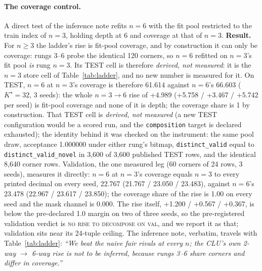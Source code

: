 \documentclass{article} %
\newcommand{\Kstar}{\ensuremath{K^{\star}}}
\begin{document}
\paragraph{The coverage control.} A direct test of the inference note refits $n=6$ with the
fit pool restricted to the train index of $n=3$, holding depth at 6 and coverage at that of $n=3$.
\textbf{Result.} For $n\ge3$ the ladder's rise is fit-pool
coverage, and by construction it can only be coverage: rungs 3--6 probe the identical 120 corners, %
so $n=6$ refitted on $n=3$'s fit pool \emph{is} rung $n=3$. Its TEST cell is therefore
\emph{derived, not measured}: it is the $n=3$ store cell of Table~\ref{tab:ladder}, and no new
number is measured for it. %
On TEST, $n=6$ at $n=3$'s coverage is therefore 61.614 against $n=6$'s 66.603 ($\Kstar=32$, 3 seeds): %
the whole $n=3\to6$ rise of +4.989 (+5.758 / +3.467 / +5.742 per seed) is fit-pool coverage and %
none of it is depth; the coverage share is 1 by construction. That TEST cell is \emph{derived, not
measured} (a new TEST configuration would be a scored run, and the \texttt{composition} target is
declared exhausted); the identity behind it was checked on the instrument: the same pool draw,
acceptance 1.000000 under either rung's bitmap, \texttt{distinct\_valid} equal to %
\texttt{distinct\_valid\_novel} in 3,600 of 3,600 published TEST rows, and the identical 8,640 %
corner rows. Validation, the one measured leg (60 corners of 24 rows, 3 seeds), measures it %
directly: $n=6$ at $n=3$'s coverage equals $n=3$ to every printed decimal on every seed, 22.767 %
(21.767 / 23.050 / 23.483), against $n=6$'s 23.478 (22.967 / 23.617 / 23.850); the coverage %
share of the rise is 1.00 on every seed and the mask channel is 0.000. The rise itself, %
+1.200 / +0.567 / +0.367, is below the pre-declared 1.0 margin on two of three seeds, so the %
pre-registered validation verdict is \textsc{no rise to decompose on val}, and we report it as
that; validation sits near its 24-tuple ceiling. The inference note, verbatim, travels with %
Table~\ref{tab:ladder}: \emph{``We beat the naive fair rivals at every $n$; the CLU's own 2-way
$\to$ 6-way rise is not to be inferred, because rungs 3--6 share corners and differ in coverage.''}
\end{document}

